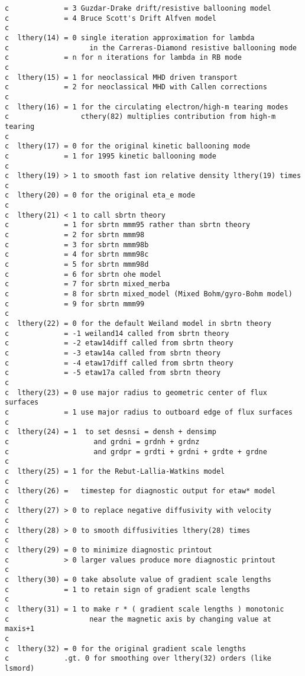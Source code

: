 \begin{verbatim}
c             = 3 Guzdar-Drake drift/resistive ballooning model
c             = 4 Bruce Scott's Drift Alfven model
c
c  lthery(14) = 0 single iteration approximation for lambda
c                   in the Carreras-Diamond resistive ballooning mode
c             = n for n iterations for lambda in RB mode
c
c  lthery(15) = 1 for neoclassical MHD driven transport
c             = 2 for neoclassical MHD with Callen corrections
c
c  lthery(16) = 1 for the circulating electron/high-m tearing modes
c                 cthery(82) multiplies contribution from high-m tearing
c
c  lthery(17) = 0 for the original kinetic ballooning mode
c             = 1 for 1995 kinetic ballooning mode
c
c  lthery(19) > 1 to smooth fast ion relative density lthery(19) times
c
c  lthery(20) = 0 for the original eta_e mode
c
c  lthery(21) < 1 to call sbrtn theory
c             = 1 for sbrtn mmm95 rather than sbrtn theory
c             = 2 for sbrtn mmm98
c             = 3 for sbrtn mmm98b
c             = 4 for sbrtn mmm98c
c             = 5 for sbrtn mmm98d
c             = 6 for sbrtn ohe model
c             = 7 for sbrtn mixed_merba
c             = 8 for sbrtn mixed_model (Mixed Bohm/gyro-Bohm model)
c             = 9 for sbrtn mmm99
c
c  lthery(22) = 0 for the default Weiland model in sbrtn theory
c             = -1 weiland14 called from sbrtn theory
c             = -2 etaw14diff called from sbrtn theory
c             = -3 etaw14a called from sbrtn theory
c             = -4 etaw17diff called from sbrtn theory
c             = -5 etaw17a called from sbrtn theory
c
c  lthery(23) = 0 use major radius to geometric center of flux surfaces
c             = 1 use major radius to outboard edge of flux surfaces
c
c  lthery(24) = 1  to set desnsi = densh + densimp
c                    and grdni = grdnh + grdnz
c                    and grdpr = grdti + grdni + grdte + grdne
c
c  lthery(25) = 1 for the Rebut-Lallia-Watkins model
c
c  lthery(26) =   timestep for diagnostic output for etaw* model
c
c  lthery(27) > 0 to replace negative diffusivity with velocity
c
c  lthery(28) > 0 to smooth diffusivities lthery(28) times
c
c  lthery(29) = 0 to minimize diagnostic printout
c             > 0 larger values produce more diagnostic printout
c
c  lthery(30) = 0 take absolute value of gradient scale lengths
c             = 1 to retain sign of gradient scale lengths
c
c  lthery(31) = 1 to make r * ( gradient scale lengths ) monotonic
c                   near the magnetic axis by changing value at maxis+1
c
c  lthery(32) = 0 for the original gradient scale lengths
c             .gt. 0 for smoothing over lthery(32) orders (like lsmord)

\end{verbatim}

